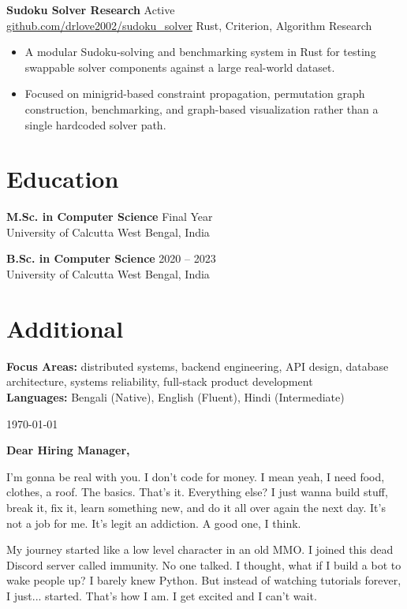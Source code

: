 \documentclass[10pt,a4paper]{article}
\newcommand{\resumesubheading}[4]{
  \textbf{#1} \hfill #2 \\
  #3 \hfill #4
}
\begin{document}
\resumesubheading{Sudoku Solver Research}{Active}{\href{https://github.com/drlove2002/sudoku_solver}{github.com/drlove2002/sudoku\_solver}}{Rust, Criterion, Algorithm Research}
\begin{itemize}
  \item A modular Sudoku-solving and benchmarking system in Rust for testing swappable solver components against a large real-world dataset.
  \item Focused on minigrid-based constraint propagation, permutation graph construction, benchmarking, and graph-based visualization rather than a single hardcoded solver path.
\end{itemize}

\section*{Education}
\resumesubheading{M.Sc. in Computer Science}{Final Year}{University of Calcutta}{West Bengal, India}
\vspace{0.15em}

\resumesubheading{B.Sc. in Computer Science}{2020 -- 2023}{University of Calcutta}{West Bengal, India}

\section*{Additional}
\textbf{Focus Areas:} distributed systems, backend engineering, API design, database architecture, systems reliability, full-stack product development\\
\textbf{Languages:} Bengali (Native), English (Fluent), Hindi (Intermediate)

\newpage
{}
\fontsize{11pt}{14pt}\selectfont
\setlength{\parskip}{0.8em}

\noindent \today

\vspace{1.2em}

\noindent \textbf{Dear Hiring Manager,}

\vspace{0.6em}

I'm gonna be real with you. I don't code for money. I mean yeah, I need food, clothes, a roof. The basics. That's it. Everything else? I just wanna build stuff, break it, fix it, learn something new, and do it all over again the next day. It's not a job for me. It's legit an addiction. A good one, I think.

My journey started like a low level character in an old MMO. I joined this dead Discord server called immunity. No one talked. I thought, what if I build a bot to wake people up? I barely knew Python. But instead of watching tutorials forever, I just... started. That's how I am. I get excited and I can't wait.
\end{document}

